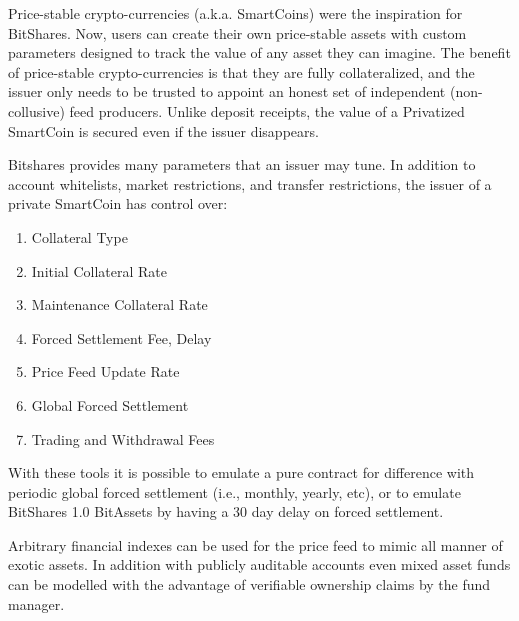 \label{sec:uia:priv}

Price-stable crypto-currencies (a.k.a. SmartCoins) were the inspiration for
BitShares. Now, users can create their own price-stable assets with custom
parameters designed to track the value of any asset they can imagine. The
benefit of price-stable crypto-currencies is that they are fully collateralized,
and the issuer only needs to be trusted to appoint an honest set of independent
(non-collusive) feed producers. Unlike deposit receipts, the value of a
Privatized SmartCoin is secured even if the issuer disappears.

Bitshares provides many parameters that an issuer may tune. In addition to
account whitelists, market restrictions, and transfer restrictions, the issuer
of a private SmartCoin has control over:

\begin{enumerate}
 \item Collateral Type
 \item Initial Collateral Rate
 \item Maintenance Collateral Rate
 \item Forced Settlement Fee, Delay %
 \item Price Feed Update Rate
 \item Global Forced Settlement
 \item Trading and Withdrawal Fees
\end{enumerate}

With these tools it is possible to emulate a pure contract for difference with
periodic global forced settlement (i.e., monthly, yearly, etc), or to emulate
BitShares 1.0 BitAssets by having a 30 day delay on forced settlement.

Arbitrary financial indexes can be used for the price feed to mimic all manner
of exotic assets. In addition with publicly auditable accounts even mixed asset
funds can be modelled with the advantage of verifiable ownership claims by the
fund manager.
